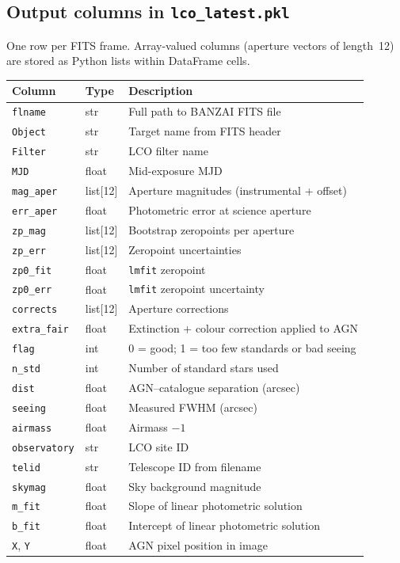 \documentclass[12pt,a4paper]{article}
\begin{document}
\subsection{Output columns in \texorpdfstring{\texttt{lco\_latest.pkl}}{lco_latest.pkl}}

One row per FITS frame.  Array-valued columns (aperture vectors of length~12) are stored
as Python lists within DataFrame cells.

\begin{center}
\small
\begin{tabular}{lll}
\toprule
Column & Type & Description \\
\midrule
\texttt{flname}      & str    & Full path to BANZAI FITS file \\
\texttt{Object}      & str    & Target name from FITS header \\
\texttt{Filter}      & str    & LCO filter name \\
\texttt{MJD}         & float  & Mid-exposure MJD \\
\texttt{mag\_aper}   & list[12] & Aperture magnitudes (instrumental + offset) \\
\texttt{err\_aper}   & float  & Photometric error at science aperture \\
\texttt{zp\_mag}     & list[12] & Bootstrap zeropoints per aperture \\
\texttt{zp\_err}     & list[12] & Zeropoint uncertainties \\
\texttt{zp0\_fit}    & float  & \texttt{lmfit} zeropoint \\
\texttt{zp0\_err}    & float  & \texttt{lmfit} zeropoint uncertainty \\
\texttt{corrects}    & list[12] & Aperture corrections \\
\texttt{extra\_fair} & float  & Extinction + colour correction applied to AGN \\
\texttt{flag}        & int    & 0 = good; 1 = too few standards or bad seeing \\
\texttt{n\_std}      & int    & Number of standard stars used \\
\texttt{dist}        & float  & AGN--catalogue separation (arcsec) \\
\texttt{seeing}      & float  & Measured FWHM (arcsec) \\
\texttt{airmass}     & float  & Airmass $-1$ \\
\texttt{observatory} & str    & LCO site ID \\
\texttt{telid}       & str    & Telescope ID from filename \\
\texttt{skymag}      & float  & Sky background magnitude \\
\texttt{m\_fit}      & float  & Slope of linear photometric solution \\
\texttt{b\_fit}      & float  & Intercept of linear photometric solution \\
\texttt{X}, \texttt{Y} & float & AGN pixel position in image \\
\bottomrule
\end{tabular}
\end{center}
\end{document}
